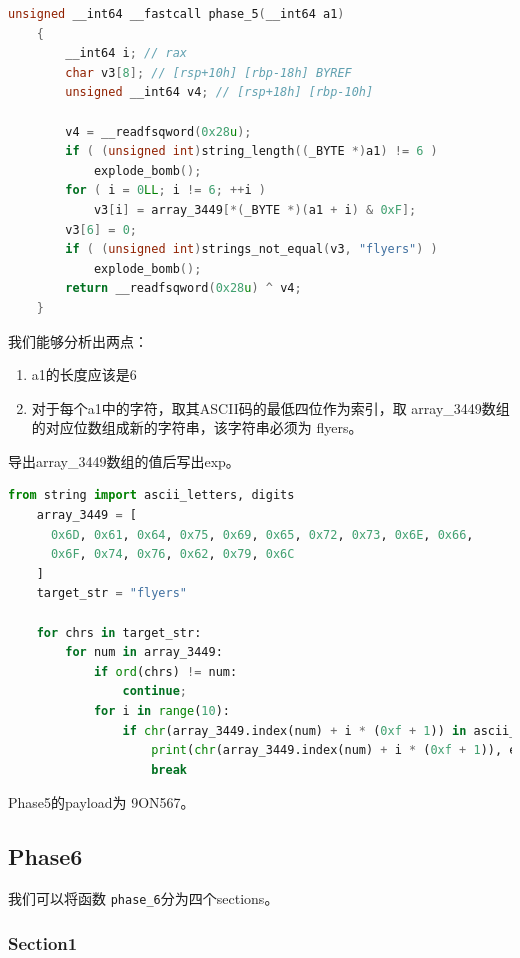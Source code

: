 \documentclass[a4pper,12pt,onecolumn]{article}
\begin{document}
\begin{lstlisting}[language=c]
    unsigned __int64 __fastcall phase_5(__int64 a1)
    {
        __int64 i; // rax
        char v3[8]; // [rsp+10h] [rbp-18h] BYREF
        unsigned __int64 v4; // [rsp+18h] [rbp-10h]

        v4 = __readfsqword(0x28u);
        if ( (unsigned int)string_length((_BYTE *)a1) != 6 )
            explode_bomb();
        for ( i = 0LL; i != 6; ++i )
            v3[i] = array_3449[*(_BYTE *)(a1 + i) & 0xF];
        v3[6] = 0;
        if ( (unsigned int)strings_not_equal(v3, "flyers") )
            explode_bomb();
        return __readfsqword(0x28u) ^ v4;
    }
\end{lstlisting}

我们能够分析出两点：

\begin{enumerate}
    \item a1的长度应该是6
    \item 对于每个a1中的字符，取其ASCII码的最低四位作为索引，取 array\_3449数组的对应位数组成新的字符串，该字符串必须为 flyers。
\end{enumerate}

导出array\_3449数组的值后写出exp。

\begin{lstlisting}[language=python]
    from string import ascii_letters, digits
    array_3449 = [
      0x6D, 0x61, 0x64, 0x75, 0x69, 0x65, 0x72, 0x73, 0x6E, 0x66, 
      0x6F, 0x74, 0x76, 0x62, 0x79, 0x6C
    ]
    target_str = "flyers"
    
    for chrs in target_str:
        for num in array_3449:
            if ord(chrs) != num:
                continue;
            for i in range(10):
                if chr(array_3449.index(num) + i * (0xf + 1)) in ascii_letters + digits:
                    print(chr(array_3449.index(num) + i * (0xf + 1)), end="")
                    break
\end{lstlisting}

Phase5的payload为 9ON567。

\subsection{Phase6}

我们可以将函数 \texttt{phase\_6}分为四个sections。

\subsubsection{Section1}
\end{document}
